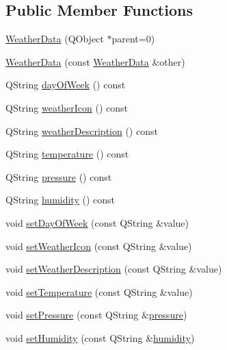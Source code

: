 \subsection*{Public Member Functions}
\begin{DoxyCompactItemize}
\item 
\hyperlink{class_weather_data_aae42655299392d3f90feec9911a2dd60}{Weather\+Data} (Q\+Object $\ast$parent=0)
\item 
\hyperlink{class_weather_data_a48baeaa6b2a77d2a5e008159188416e8}{Weather\+Data} (const \hyperlink{class_weather_data}{Weather\+Data} \&other)
\item 
Q\+String \hyperlink{class_weather_data_a413b0ccf3fad036782ee5f5cb66f9a62}{day\+Of\+Week} () const
\item 
Q\+String \hyperlink{class_weather_data_a5baf2d9cc08741d7af4a07d61df95ee4}{weather\+Icon} () const
\item 
Q\+String \hyperlink{class_weather_data_a63a3528697c8681bd32d4d170ec91f76}{weather\+Description} () const
\item 
Q\+String \hyperlink{class_weather_data_a5a193e8410e3a146de59bab224cd88f0}{temperature} () const
\item 
Q\+String \hyperlink{class_weather_data_af726e713890bd6d310fe4a718dd69c77}{pressure} () const
\item 
Q\+String \hyperlink{class_weather_data_a0a83b2ee5398eaba062e3c6fe9264a3d}{humidity} () const
\item 
void \hyperlink{class_weather_data_ab47f3e7cde6cf4d93dfb1750ac014f00}{set\+Day\+Of\+Week} (const Q\+String \&value)
\item 
void \hyperlink{class_weather_data_a2a8093aaf20e1fb3c63c429a4ae0a977}{set\+Weather\+Icon} (const Q\+String \&value)
\item 
void \hyperlink{class_weather_data_a68686722f2e0bbf5cb28f0fdc96e280d}{set\+Weather\+Description} (const Q\+String \&value)
\item 
void \hyperlink{class_weather_data_afee514cbb8713059cf8d0602b33cadf5}{set\+Temperature} (const Q\+String \&value)
\item 
void \hyperlink{class_weather_data_ad5b453016656864e2bc3a09fc75919a0}{set\+Pressure} (const Q\+String \&\hyperlink{class_weather_data_a2529c61089c163abf0e2dd80a51c47cb}{pressure})
\item 
void \hyperlink{class_weather_data_aad895695b5f0651c58657973f2140509}{set\+Humidity} (const Q\+String \&\hyperlink{class_weather_data_acf762ef73e6056b6cc8716e1aa1c7220}{humidity})
\end{DoxyCompactItemize}
